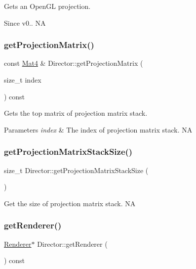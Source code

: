 Gets an Open\+GL projection. \begin{DoxySince}{Since}
v0..  NA 
\end{DoxySince}
\mbox{\label{classDirector_ada87fe90413c1c1045b705009969aaa8}} 
\subsubsection{\texorpdfstring{get\+Projection\+Matrix()}{getProjectionMatrix()}}
{\footnotesize\ttfamily const \hyperlink{classMat4}{Mat4} \& Director\+::get\+Projection\+Matrix (\begin{DoxyParamCaption}\item[{size\+\_\+t}]{index }\end{DoxyParamCaption}) const}

Gets the top matrix of projection matrix stack. 
\begin{DoxyParams}{Parameters}
{\em index} & The index of projection matrix stack.  NA \\
\hline
\end{DoxyParams}
\mbox{\label{classDirector_aa8f831f8e9272790b8d1efdc3726cf12}} 
\subsubsection{\texorpdfstring{get\+Projection\+Matrix\+Stack\+Size()}{getProjectionMatrixStackSize()}}
{\footnotesize\ttfamily size\+\_\+t Director\+::get\+Projection\+Matrix\+Stack\+Size (\begin{DoxyParamCaption}{ }\end{DoxyParamCaption})}

Get the size of projection matrix stack.  NA \mbox{\label{classDirector_a45e283c703cf856467ccbe484da739c5}} 
\subsubsection{\texorpdfstring{get\+Renderer()}{getRenderer()}\hspace{0.1cm}{\footnotesize\ttfamily [1/2]}}
{\footnotesize\ttfamily \hyperlink{classRenderer}{Renderer}$\ast$ Director\+::get\+Renderer (\begin{DoxyParamCaption}{ }\end{DoxyParamCaption}) const\hspace{0.3cm}{\ttfamily [inline]}}


